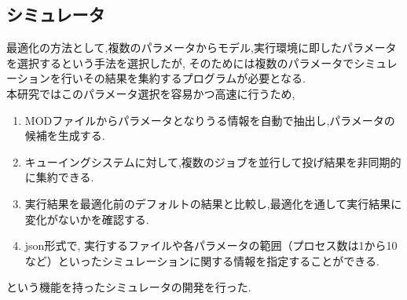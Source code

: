 \subsection{シミュレータ}
最適化の方法として,複数のパラメータからモデル,実行環境に即したパラメータを選択するという手法を選択したが,
そのためには複数のパラメータでシミュレーションを行いその結果を集約するプログラムが必要となる.\\
本研究ではこのパラメータ選択を容易かつ高速に行うため,\\
\begin{enumerate}
\item MODファイルからパラメータとなりうる情報を自動で抽出し,パラメータの候補を生成する.
\item キューイングシステムに対して,複数のジョブを並行して投げ結果を非同期的に集約できる.
\item 実行結果を最適化前のデフォルトの結果と比較し,最適化を通して実行結果に変化がないかを確認する.
\item json形式で, 実行するファイルや各パラメータの範囲（プロセス数は1から10など）といったシミュレーションに関する情報を指定することができる.
\end{enumerate}
という機能を持ったシミュレータの開発を行った.\\

